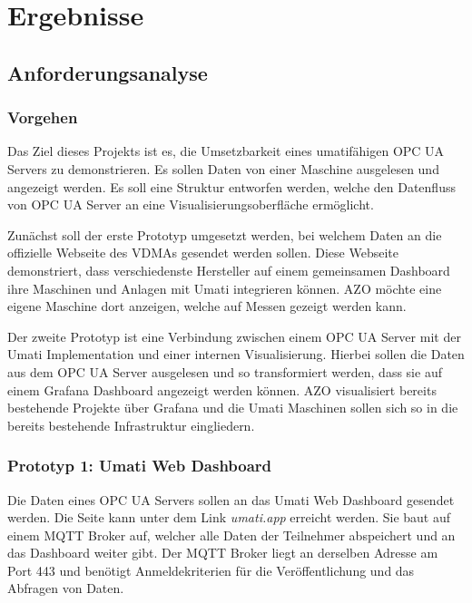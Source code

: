 \documentclass[a4paper, 12pt, oneside, toc=listofnumbered, bibliography=totoc]{scrbook}
\begin{document}
\chapter{Ergebnisse}\label{ch:Ergebnisse}
	
	
	\section{Anforderungsanalyse}
		
		\subsection{Vorgehen}
		Das Ziel dieses Projekts ist es, die Umsetzbarkeit eines umatifähigen OPC UA Servers zu demonstrieren. Es sollen Daten von einer Maschine ausgelesen und angezeigt werden. Es soll eine Struktur entworfen werden, welche den Datenfluss von OPC UA Server an eine Visualisierungsoberfläche ermöglicht.
		
		Zunächst soll der erste Prototyp umgesetzt werden, bei welchem Daten an die offizielle Webseite des VDMAs gesendet werden sollen. Diese Webseite demonstriert, dass verschiedenste Hersteller auf einem gemeinsamen Dashboard ihre Maschinen und Anlagen mit Umati integrieren können. AZO möchte eine eigene Maschine dort anzeigen, welche auf Messen gezeigt werden kann.
		
		Der zweite Prototyp ist eine Verbindung zwischen einem OPC UA Server mit der Umati Implementation und einer internen Visualisierung. Hierbei sollen die Daten aus dem OPC UA Server ausgelesen und so transformiert werden, dass sie auf einem Grafana Dashboard angezeigt werden können. AZO visualisiert bereits bestehende Projekte über Grafana und die Umati Maschinen sollen sich so in die bereits bestehende Infrastruktur eingliedern.
		
		\subsection{Prototyp 1: Umati Web Dashboard}
		
		Die Daten eines OPC UA Servers sollen an das Umati Web Dashboard gesendet werden. Die Seite kann unter dem Link \textit{umati.app} erreicht werden. Sie baut auf einem MQTT Broker auf, welcher alle Daten der Teilnehmer abspeichert und an das Dashboard weiter gibt. Der MQTT Broker liegt an derselben Adresse am Port 443 und benötigt Anmeldekriterien für die Veröffentlichung und das Abfragen von Daten.
		
\end{document}
